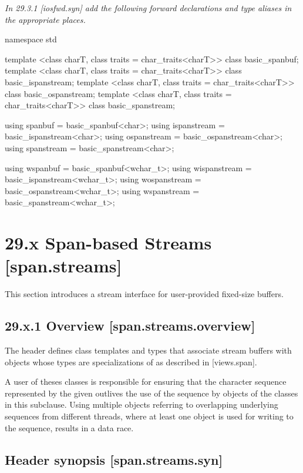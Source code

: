 \documentclass[ebook,11pt,article]{memoir}
\begin{document}
\emph{In 29.3.1 [iosfwd.syn] add the following forward declarations and type aliases in the appropriate places.}

\begin{codeblock}
namespace std {
  template <class charT, class traits = char_traits<charT>>
    class basic_spanbuf;
  template <class charT, class traits = char_traits<charT>>
    class basic_ispanstream;
  template <class charT, class traits = char_traits<charT>>
    class basic_ospanstream;
  template <class charT, class traits = char_traits<charT>>
    class basic_spanstream;

  using spanbuf     = basic_spanbuf<char>;
  using ispanstream = basic_ispanstream<char>;
  using ospanstream = basic_ospanstream<char>;
  using spanstream  = basic_spanstream<char>;

  using wspanbuf     = basic_spanbuf<wchar_t>;
  using wispanstream = basic_ispanstream<wchar_t>;
  using wospanstream = basic_ospanstream<wchar_t>;
  using wspanstream  = basic_spanstream<wchar_t>;
}
\end{codeblock}



\section{29.x Span-based Streams [span.streams]}

\pnum
This section introduces a stream interface for user-provided fixed-size buffers. 
\subsection{29.x.1 Overview [span.streams.overview]}

\pnum
The header  defines class templates and types that associate stream buffers with objects whose types are specializations of  as described in [views.span]. 

\begin{note}
A user of theses classes is responsible for ensuring that the character sequence represented by the given  outlives the use of the sequence by objects of the classes in this subclause. Using multiple  objects referring to overlapping underlying sequences from different threads, where at least one  object is used for writing to the sequence, results in a data race.
\end{note}

\subsection{Header  synopsis [span.streams.syn]}
\end{document}
